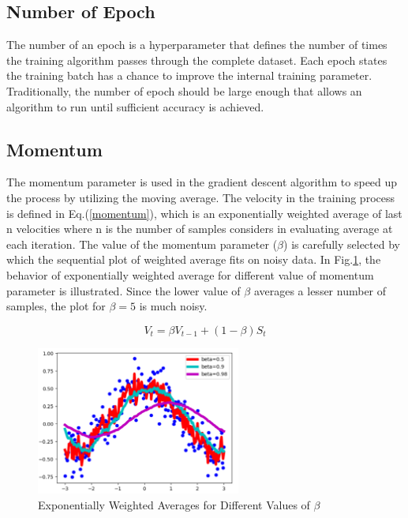 \subsection{Number of Epoch}
The number of an epoch is a hyperparameter that defines the number of times the training algorithm passes through the complete dataset. Each epoch states the training batch has a chance to improve the internal training parameter. Traditionally, the number of epoch should be large enough that allows an algorithm to run until sufficient accuracy is achieved.

\subsection{Momentum}
The momentum parameter is used in the gradient descent algorithm to speed up the process by utilizing the moving average. The velocity in the training process is defined in Eq.(\ref{momentum}), which is an exponentially weighted average of last n velocities where n is the number of samples considers in evaluating average at each iteration. The value of the momentum parameter ($\beta$) is carefully selected by which the sequential plot of weighted average fits on noisy data. In Fig.\ref{momentumpara}, the behavior of exponentially weighted average for different value of momentum parameter is illustrated. Since the lower value of $\beta$ averages a lesser number of samples, the plot for $\beta = 5$ is much noisy.     

\begin{equation}
\label{momentum}
V_{t}=\beta V_{t-1}+(1-\beta) S_{t}
\end{equation}

\begin{figure}
    \centering
    \includegraphics[width=0.6\textwidth]{Images/momentumpara.png}
    \caption{Exponentially Weighted Averages for Different Values of $\beta$ \cite{gradientdescent}}
    \label{momentumpara}
\end{figure}

